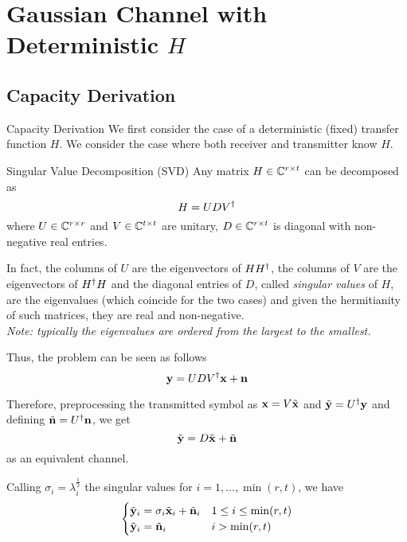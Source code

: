 \section{Gaussian Channel with Deterministic $H$}
\subsection{Capacity Derivation}
\begin{frame}[allowframebreaks]{Capacity Derivation}
We first consider the case of a deterministic (fixed) transfer function $H$. We consider the case where \alert{both receiver and transmitter know $H$}.

\begin{block}{Singular Value Decomposition (SVD)}\justify
Any matrix $H\in \mathbb{C}^{r\times t}$ can be decomposed as
$$H = UDV^\dagger$$
where $U\in \mathbb{C}^{r\times r}$ and $V \in \mathbb{C}^{t\times t}$ are unitary, $D\in \mathbb{C}^{r\times t}$ is diagonal with non-negative real entries.

In fact, the columns of $U$ are the eigenvectors of $HH^\dagger$, the columns of $V$ are the eigenvectors of $H^\dagger H$ and the diagonal entries of $D$, called \textit{singular values} of $H$, are the eigenvalues (which coincide for the two cases) and given the hermitianity of such matrices, they are real and non-negative.\\
\textit{Note: typically the eigenvalues are ordered from the largest to the smallest.}
\end{block}

\framebreak

Thus, the problem can be seen as follows
$$\vb{y} = UDV^\dagger\vb{x} + \vb{n}$$

Therefore, preprocessing the transmitted symbol as $\vb{x} = V\tilde{\vb{x}}$ and $\tilde{\vb{y}}=U^\dagger\vb{y}$ and defining $\tilde{\vb{n}} = U^\dagger\vb{n}$, we get
$$\tilde{\vb{y}} = D\tilde{\vb{x}} + \tilde{\vb{n}}$$
as an equivalent channel.

\myspace
Calling $\sigma_i = \lambda_i^{\frac{1}{2}}$ the singular values for $i=1,\ldots,\min(r,t)$, we have
\begin{equation*}
\begin{cases}
\tilde{\vb{y}}_i = \sigma_i \tilde{\vb{x}}_i + \tilde{\vb{n}}_i & 1\leq i\leq \min(r,t)\\
\tilde{\vb{y}}_i = \tilde{\vb{n}}_i & i > \min(r,t)
\end{cases}
\end{equation*}


\end{frame}
